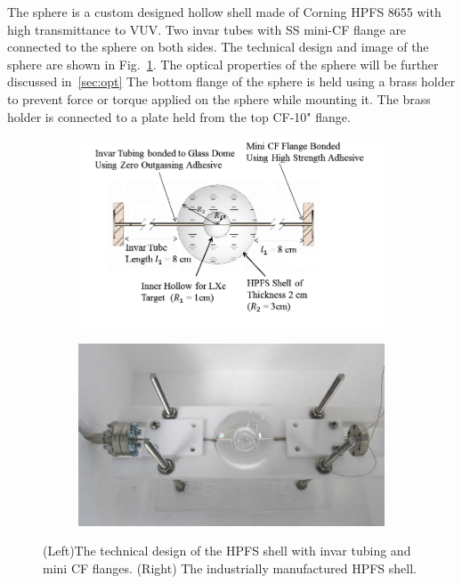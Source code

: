 
The sphere is a custom designed hollow shell made of Corning HPFS 8655 with high transmittance to VUV. Two invar tubes with SS mini-CF flange are connected to the sphere on both sides. The technical design and image of the sphere are shown in Fig.~\ref{fig:sphere}. The optical properties of the sphere will be further discussed in~\ref{sec:opt} 
The bottom flange of the sphere is held using a brass holder to prevent 
force or torque applied on the sphere while mounting it. The 
brass holder is connected to a plate held from the top CF-10" flange. 


\begin{figure}[h]
\centering
\begin{subfigure}[c]{0.4\textheight}
\includegraphics[width=\textwidth]{spheredesign1.png}
\end{subfigure}
\begin{subfigure}[c]{0.25\textheight}
\includegraphics[width=\textwidth]{spherephoto.png}
\end{subfigure}
\caption{(Left)The technical design of the HPFS shell with invar tubing and mini CF flanges. 
(Right) The industrially manufactured HPFS shell.} 
\label{fig:sphere}
\end{figure}



